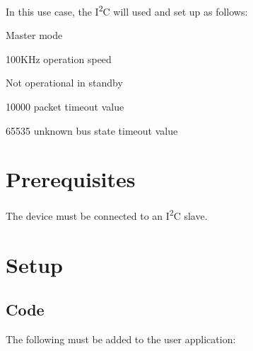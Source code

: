 In this use case, the I\textsuperscript{2}C will used and set up as follows\+:
\begin{DoxyItemize}
\item Master mode
\item 100K\+Hz operation speed
\item Not operational in standby
\item 10000 packet timeout value
\item 65535 unknown bus state timeout value
\end{DoxyItemize}\hypertarget{asfdoc_sam0_sercom_i2c_master_basic_use_case_asfdoc_sam0_sercom_i2c_master_basic_use_case_prereq}{}\section{Prerequisites}\label{asfdoc_sam0_sercom_i2c_master_basic_use_case_asfdoc_sam0_sercom_i2c_master_basic_use_case_prereq}
The device must be connected to an I\textsuperscript{2}C slave.\hypertarget{asfdoc_sam0_sercom_i2c_master_basic_use_case_asfdoc_sam0_sercom_i2c_master_basic_use_setup}{}\section{Setup}\label{asfdoc_sam0_sercom_i2c_master_basic_use_case_asfdoc_sam0_sercom_i2c_master_basic_use_setup}
\hypertarget{asfdoc_sam0_sercom_i2c_master_basic_use_case_asfdoc_sam0_sercom_i2c_master_basic_use_setup_code}{}\subsection{Code}\label{asfdoc_sam0_sercom_i2c_master_basic_use_case_asfdoc_sam0_sercom_i2c_master_basic_use_setup_code}
The following must be added to the user application\+:


